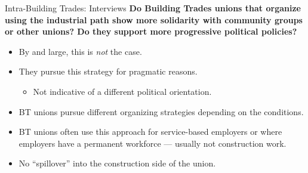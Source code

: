 \documentclass{beamer}
\begin{document}
\begin{frame}{Intra-Building Trades: Interviews}
\textbf{Do Building Trades unions that organize using the industrial path show more solidarity with community groups or other unions? Do they support more progressive political policies?}\newline
	\begin{itemize}
		\item By and large, this is \emph{not} the case.
		\item They pursue this strategy for pragmatic reasons.
		\begin{itemize}
			\item Not indicative of a different political orientation.
		\end{itemize}
		\item BT unions pursue different organizing strategies depending on the conditions.
		\item BT unions often use this approach for service-based employers or where employers have a permanent workforce — usually not construction work.
		\item No “spillover” into the construction side of the union.
	\end{itemize}
\end{frame}



\end{document}
